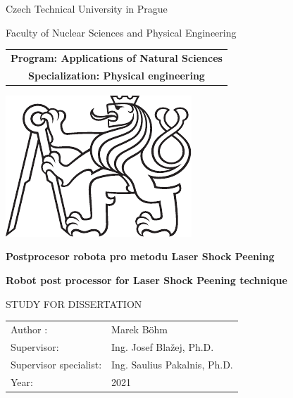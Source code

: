 \documentclass[a4paper,twoside,12pt]{book}
\newcommand{\tb}{\textbf} %
\newcommand{\cvut}{Czech Technical University in Prague}
\newcommand{\fjfi}{Faculty of Nuclear Sciences and Physical Engineering }
\newcommand{\program}{Applications of Natural Sciences}
\newcommand{\obor}{Physical engineering} %
\newcommand{\druh}{Study for dissertation} %
\newcommand{\logoCVUT}{\includegraphics{img/symbol_cvut.pdf}} %
\newcommand{\nazevcz}{Postprocesor robota pro metodu Laser Shock Peening}    %
\newcommand{\nazeven}{Robot post processor for Laser Shock Peening technique}          %
\newcommand{\autor}{Marek Böhm}   %
\newcommand{\vedouci}{Ing. Josef Blažej, Ph.D.} %
\newcommand{\specialist}{Ing. Saulius Pakalnis, Ph.D.} %
\newcommand{\rok}{2021}  %
\begin{document}
\frontmatter
\thispagestyle{empty}

\begin{center}
	{\LARGE
		\cvut\par
		\fjfi
	}
    \vspace{10mm}

    \begin{tabular}{c}
		\tb{Program: \program}  \\[3pt]   
		\tb{Specialization: \obor}\\
    \end{tabular}

   \vspace{10mm} \logoCVUT \vspace{15mm} 

   {\huge \tb{\nazevcz}\par}
   \vspace{5mm}   
   {\huge \tb{\nazeven}\par}
   
   \vspace{15mm}
   {\Large \MakeUppercase{\druh}}

   \vfill
   {\large
    \begin{tabular}{ll}
    Author : & \autor\\
    Supervisor: & \vedouci\\
    Supervisor specialist: & \specialist\\
    Year: & \rok
    \end{tabular}
   }
\end{center}

\clearpage{\pagestyle{empty}\cleardoublepage} %



\newpage  %
\thispagestyle{empty} %

%
%
%
\end{document}

